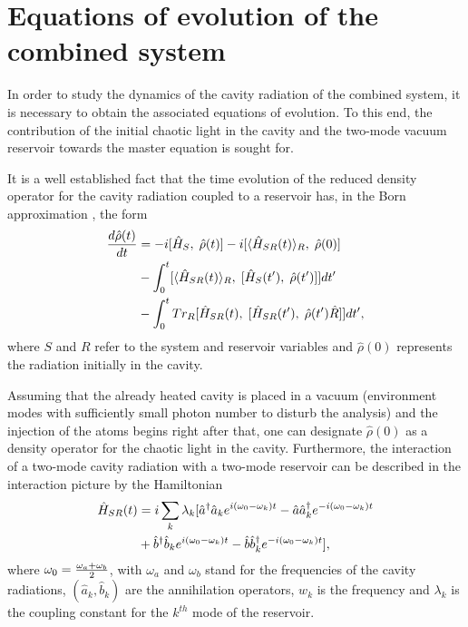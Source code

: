 \documentclass[twocolumn,showpacs,preprintnumbers,amsmath,amssymb,pra]{revtex4}
\begin{document}
\section{Equations of evolution of the combined system}

In order to study the dynamics of the cavity radiation of the combined system, it is necessary to obtain the associated equations of evolution. To this end, the contribution of the initial chaotic light in the cavity and the two-mode vacuum reservoir towards the master equation is sought for. 

It is a well established fact that the time evolution of the reduced density operator for the cavity radiation
coupled to a reservoir has, in the Born approximation \cite{lou}, the form
\begin{align}\label{s14}\frac{d\hat{\rho}(t)}{dt} &= -i[\hat{H}_{S},\;\hat{\rho}(t)] -
i[\langle\hat{H}_{SR}(t)\rangle_{R},\; \hat{\rho}(0)] \notag\\&-
\int_{0}^{t}[\langle\hat{H}_{SR}(t)\rangle_{R},\;
[\hat{H}_{S}(t'), \;\hat{\rho}(t')]]dt' \notag\\&-
\int_{0}^{t}Tr_{R}[\hat{H}_{SR}(t),\; [\hat{H}_{SR}(t'),\;
\hat{\rho}(t')\hat{R}]]dt',\end{align} where $S$ and $R$ refer to
the system and reservoir variables and $\hat{\rho}(0)$ represents the radiation initially in the cavity. 

Assuming that the already heated cavity is placed in a vacuum (environment modes with sufficiently small photon number to disturb the analysis) and the injection of the atoms begins right after that, one can designate $\hat{\rho}(0)$ as a density operator for the chaotic light in the cavity.   Furthermore, the interaction of a two-mode cavity radiation with a two-mode reservoir can be
described in the interaction picture by the Hamiltonian
\begin{align}\label{s15}\hat{H}_{SR}(t) &=
i\sum_{k}\lambda_{k}[\hat{a}^{\dagger}\hat{a}_{k}e^{i(\omega_{0}-\omega_{k})t}
- \hat{a}\hat{a}^{\dagger}_{k}e^{-i(\omega_{0}-\omega_{k})t} \notag\\&+
\hat{b}^{\dagger}\hat{b}_{k}e^{i(\omega_{0}-\omega_{k})t} -
\hat{b}\hat{b}^{\dagger}_{k}e^{-i(\omega_{0}-\omega_{k})t}],\end{align}
where $\omega_{0}={\omega_{a}+\omega_{b}\over2}$, with
$\omega_{a}$ and $\omega_{b}$ stand for the frequencies of the cavity radiations, $(\hat{a}_{k},\hat{b}_{k})$ are the
annihilation operators, $w_{k}$ is the frequency and
$\lambda_{k}$ is the coupling constant for the $k^{th}$ mode
of the reservoir. 
\end{document}
